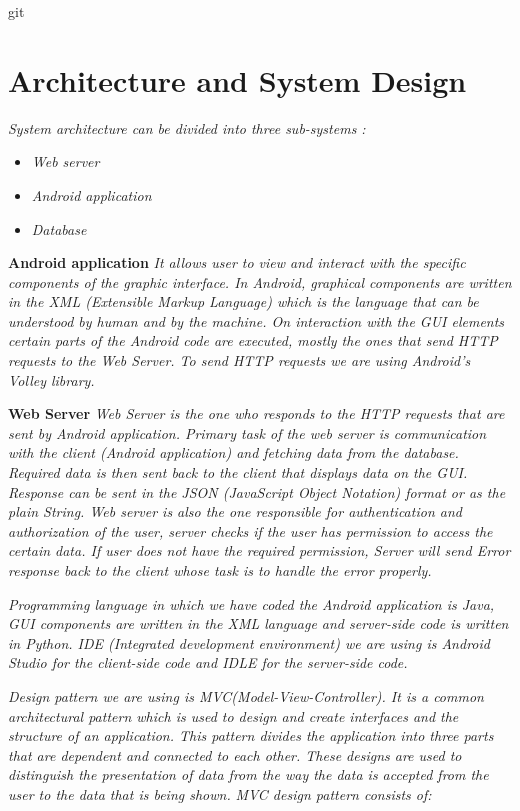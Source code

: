 git \chapter{Architecture and System Design}

		\textit{ System architecture can be divided into three sub-systems :}
	\begin{itemize}
		\item 	\textit{Web server}
		\item 	\textit{Android application}
		\item 	\textit{Database}		
	\end{itemize}
		
		\textbf{Android application}
		\textit{It allows user to view and interact with the specific components of the graphic interface. In Android, graphical components are written in the XML (Extensible Markup Language) which is the language that can be understood by human and by the machine. On interaction with the GUI elements certain parts of the Android code are executed, mostly the ones that send HTTP requests to the Web Server. To send HTTP requests we are using Android’s Volley library.}

		\textbf{Web Server }
		\textit{Web Server is the one who responds to the HTTP requests that are sent by Android application. Primary task of the web server is communication with the client (Android application) and fetching data from the database. Required data is then sent back to the client that displays data on the GUI. Response can be sent in the JSON (JavaScript Object Notation) format or as the plain String. Web server is also the one responsible for authentication and authorization of the user, server checks if the user has permission to access the certain data. If user does not have the required permission, Server will send Error response back to the client whose task is to handle the error properly. }

		\textit{Programming language in which we have coded the Android application is Java, GUI components are written in the XML language and server-side code is written in Python. IDE (Integrated development environment) we are using is Android Studio for the client-side code and IDLE for the server-side code.}

		\textit{Design pattern we are using is MVC(Model-View-Controller). It is a common architectural pattern which is used to design and create interfaces and the structure of an application. This pattern divides the application into three parts that are dependent and connected to each other. These designs are used to distinguish the presentation of data from the way the data is accepted from the user to the data that is being shown. }
		\textit{MVC design pattern consists of: }
			
